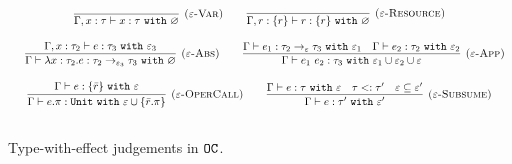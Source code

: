 \begin{figure}[h]

\noindent
{}

\[
\begin{array}{c}

\infer[\textsc{($\varepsilon$-Var)}]
	{ \Gamma, x:\tau \vdash x: \tau~\kw{with} \varnothing }
	{}
	
	\hspace{5ex}
	
\infer[\textsc{($\varepsilon$-Resource)}]
 	{ \Gamma, r: \{ r \} \vdash r : \{ r \}~\kw{with} \varnothing }
 	{} \\[3ex]
 	
 	~~~
	\infer[\textsc{($\varepsilon$-Abs)}]
	{ \Gamma \vdash \lambda x:\tau_2 . e : \tau_2 \rightarrow_{\varepsilon_3} \tau_3~\kw{with} \varnothing }
	{ \Gamma, x: \tau_2 \vdash e: \tau_3~\kw{with} \varepsilon_3 }
	
	\hspace{5ex}
	
\infer[\textsc{($\varepsilon$-App)}]
	{ \Gamma \vdash e_1~e_2 : \tau_3~\kw{with} \varepsilon_1 \cup \varepsilon_2 \cup \varepsilon  }
	{ \Gamma \vdash e_1: \tau_2 \rightarrow_{\varepsilon} \tau_3~\kw{with} \varepsilon_1 & \Gamma \vdash e_2: \tau_2~\kw{with} \varepsilon_2 } \\[3ex]
	
\infer[\textsc{($\varepsilon$-OperCall)}]
	{ \Gamma \vdash e.\pi: \kw{Unit} \kw{with} \varepsilon \cup \{ \bar r.\pi \} }
	{ \Gamma \vdash e: \{ \bar r \}~ \kw{with} \varepsilon}

	\hspace{5ex}
    
\infer[\textsc{($\varepsilon$-Subsume)}]
	{ \Gamma \vdash e: \tau' ~\kw{with} \varepsilon'}
	{ \Gamma \vdash e: \tau ~\kw{with} \varepsilon & \tau <: \tau' & \varepsilon \subseteq \varepsilon'}\\[3ex]
	
\end{array}
\]


\vspace{-7pt}
\caption{Type-with-effect judgements in $\mathtt{OC}$.}
\label{fig:opercalc_static_rules}
\end{figure}




